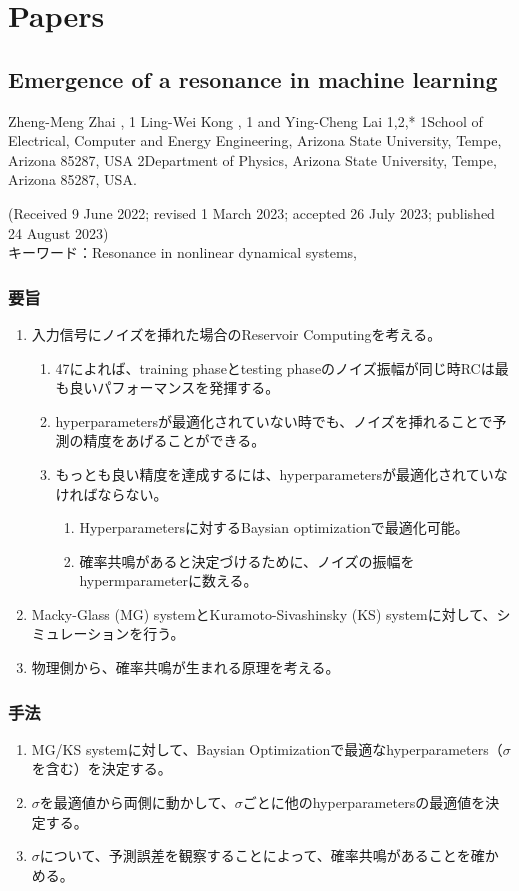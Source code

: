 \section{Papers}
\subsection{Emergence of a resonance in machine learning}
Zheng-Meng Zhai , 1 Ling-Wei Kong , 1 and Ying-Cheng Lai 1,2,*
1School of Electrical, Computer and Energy Engineering, Arizona State University, Tempe, Arizona 85287, USA
2Department of Physics, Arizona State University, Tempe, Arizona 85287, USA.

\noindent (Received 9 June 2022; revised 1 March 2023; accepted 26 July 2023; published 24 August 2023)
\\

\noindent キーワード：Resonance in nonlinear dynamical systems, 

\subsubsection{要旨}

\begin{enumerate}
  \item 入力信号にノイズを挿れた場合のReservoir Computingを考える。\begin{enumerate}
    \item 47によれば、training phaseとtesting phaseのノイズ振幅が同じ時RCは最も良いパフォーマンスを発揮する。
    \item hyperparametersが最適化されていない時でも、ノイズを挿れることで予測の精度をあげることができる。
    \item もっとも良い精度を達成するには、hyperparametersが最適化されていなければならない。\begin{enumerate}
      \item Hyperparametersに対するBaysian optimizationで最適化可能。
      \item 確率共鳴があると決定づけるために、ノイズの振幅をhypermparameterに数える。
    \end{enumerate}
  \end{enumerate} 
  \item Macky-Glass (MG) systemとKuramoto-Sivashinsky (KS) systemに対して、シミュレーションを行う。
  \item 物理側から、確率共鳴が生まれる原理を考える。
\end{enumerate}

\subsubsection{手法}
\begin{enumerate}
  \item MG/KS systemに対して、Baysian Optimizationで最適なhyperparameters（$\sigma$を含む）を決定する。
  \item $\sigma$を最適値から両側に動かして、$\sigma$ごとに他のhyperparametersの最適値を決定する。
  \item $\sigma$について、予測誤差を観察することによって、確率共鳴があることを確かめる。
\end{enumerate}
\clearpage


